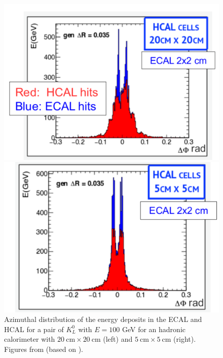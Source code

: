 \begin{figure}
	\centering
	\begin{minipage}{.5\textwidth}
		\centering
		\includegraphics[trim={0 0 0 .4cm},clip,width=\linewidth]{./Figures/hcal_gran_doubleK1.png}
	\end{minipage}%
	\begin{minipage}{.5\textwidth}
		\centering
		\includegraphics[width=\linewidth]{./Figures/hcal_gran_doubleK2.png}
	\end{minipage}
	\caption{Azimuthal distribution of the energy deposits in the ECAL and HCAL for a pair of $K_L^0$ with $E=100$ GeV for an hadronic calorimeter with $20~\text{cm}\times 20~\text{cm}$ (left) and $5~\text{cm}\times 5~\text{cm}$ (right). Figures from \cite{BOOST2017} (based on \cite{FCC_HCALgran_doubleK}).}
	\label{fig:hcal_gran_doubleK}
\end{figure}
